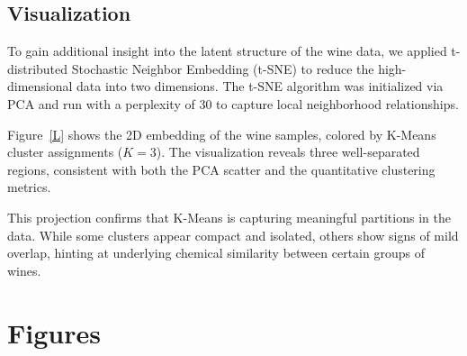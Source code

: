 \documentclass[12pt]{article}
\begin{document}
 \subsection*{ Visualization}

To gain additional insight into the latent structure of the wine data, we applied t-distributed Stochastic Neighbor Embedding (t-SNE) to reduce the high-dimensional data into two dimensions. The t-SNE algorithm was initialized via PCA and run with a perplexity of 30 to capture local neighborhood relationships.

Figure~\ref{L} shows the 2D embedding of the wine samples, colored by K-Means cluster assignments ($K=3$). The visualization reveals three well-separated regions, consistent with both the PCA scatter and the quantitative clustering metrics.

This projection confirms that K-Means is capturing meaningful partitions in the data. While some clusters appear compact and isolated, others show signs of mild overlap, hinting at underlying chemical similarity between certain groups of wines.


\section*{Figures}
\end{document}
